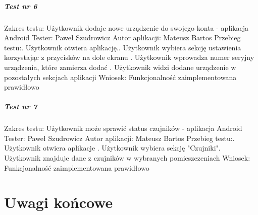 \documentclass[polish,bachelor,a4paper,oneside]{ppfcmthesis}
\begin{document}
    \paragraph{Test nr 6}
    Zakres testu:\newline
    Użytkownik dodaje nowe urządzenie do swojego konta - aplikacja Android\newline
    Tester: Paweł Szudrowicz \newline
    Autor aplikacji: Mateusz Bartos \newline
    Przebieg testu:. Użytkownik otwiera aplikację.. Użytkownik wybiera sekcję ustawienia korzystając z przycisków na dole ekranu . Użytkownik wprowadza numer seryjny urządzenia, które zamierza dodać . Użytkownik widzi dodane urządzenie w pozostałych sekcjach aplikacji\newline
    Wniosek:\newline
    Funkcjonalność zaimplementowana prawidłowo\newline
    \newline

    \paragraph{Test nr 7}
    Zakres testu:\newline
    Użytkownik może sprawić status czujników - aplikacja Android\newline
    Tester: Paweł Szudrowicz \newline
    Autor aplikacji: Mateusz Bartos \newline
    Przebieg testu:. Użytkownik otwiera aplikacje . Użytkownik wybiera sekcję "Czujniki". Użytkownik znajduje dane z czujników w wybranych pomieszczeniach\newline
    Wniosek:\newline
    Funkcjonalność zaimplementowana prawidłowo\newline
    \newline

    \chapter{Uwagi końcowe}
\end{document}
